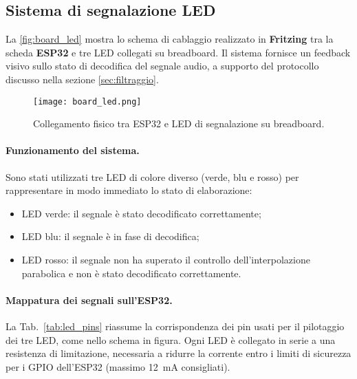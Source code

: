 \subsection{Sistema di segnalazione LED}
\label{subsec:led_system}

La \autoref{fig:board_led} mostra lo schema di cablaggio realizzato in \textbf{Fritzing} tra la scheda \textbf{ESP32} e tre LED collegati su breadboard.  
Il sistema fornisce un feedback visivo sullo stato di decodifica del segnale audio, a supporto del protocollo discusso nella sezione \ref{sec:filtraggio}.  

\begin{figure}[H]
  \centering
  \texttt{[image: board\_led.png]}
  \caption{Collegamento fisico tra ESP32 e LED di segnalazione su breadboard.}
  \label{fig:board_led}
\end{figure} 

\paragraph{Funzionamento del sistema.}
Sono stati utilizzati tre LED di colore diverso (verde, blu e rosso) per rappresentare in modo immediato lo stato di elaborazione:  
\begin{itemize}
  \item LED verde: il segnale è stato decodificato correttamente;
  \item LED blu: il segnale è in fase di decodifica;
  \item LED rosso: il segnale non ha superato il controllo dell’interpolazione parabolica e non è stato decodificato correttamente.
\end{itemize}

\paragraph{Mappatura dei segnali sull'ESP32.}
La Tab.~\ref{tab:led_pins} riassume la corrispondenza dei pin usati per il pilotaggio dei tre LED, come nello schema in figura.  
Ogni LED è collegato in serie a una resistenza di limitazione, necessaria a ridurre la corrente entro i limiti di sicurezza per i GPIO dell’ESP32 (massimo \SI{12}{mA} consigliati).


